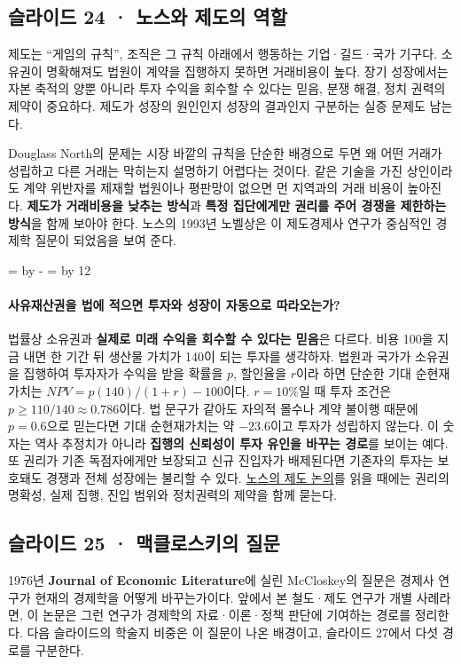 \documentclass[10pt,a4paper]{article}
\newcommand{\ReserveQuestionSpace}{%
  \par\begingroup
  \dimen0=\pagegoal \advance\dimen0 by -\pagetotal
  \dimen2=\baselineskip \multiply\dimen2 by 12
  \ifdim\dimen0<\dimen2 \newpage\fi
  \endgroup}
\begin{document}
\subsection{슬라이드 24 · 노스와 제도의 역할}
제도는 “게임의 규칙”, 조직은 그 규칙 아래에서 행동하는 기업·길드·국가 기구다. 소유권이 명확해져도 법원이 계약을 집행하지 못하면 거래비용이 높다. 장기 성장에서는 자본 축적의 양뿐 아니라 투자 수익을 회수할 수 있다는 믿음, 분쟁 해결, 정치 권력의 제약이 중요하다. 제도가 성장의 원인인지 성장의 결과인지 구분하는 실증 문제도 남는다.\par

Douglass North의 문제는 시장 바깥의 규칙을 단순한 배경으로 두면 왜 어떤 거래가 성립하고 다른 거래는 막히는지 설명하기 어렵다는 것이다. 같은 기술을 가진 상인이라도 계약 위반자를 제재할 법원이나 평판망이 없으면 먼 지역과의 거래 비용이 높아진다. \textbf{제도가 거래비용을 낮추는 방식}과 \textbf{특정 집단에게만 권리를 주어 경쟁을 제한하는 방식}을 함께 보아야 한다. 노스의 1993년 노벨상은 이 제도경제사 연구가 중심적인 경제학 질문이 되었음을 보여 준다.\par

\ReserveQuestionSpace
\paragraph{사유재산권을 법에 적으면 투자와 성장이 자동으로 따라오는가?}
법률상 소유권과 \textbf{실제로 미래 수익을 회수할 수 있다는 믿음}은 다르다. 비용 100을 지금 내면 한 기간 뒤 생산물 가치가 140이 되는 투자를 생각하자. 법원과 국가가 소유권을 집행하여 투자자가 수익을 받을 확률을 $p$, 할인율을 $r$이라 하면 단순한 기대 순현재가치는 $NPV=p(140)/(1+r)-100$이다. $r=10\%$일 때 투자 조건은 $p\geq110/140\approx0.786$이다. 법 문구가 같아도 자의적 몰수나 계약 불이행 때문에 $p=0.6$으로 믿는다면 기대 순현재가치는 약 $-23.6$이고 투자가 성립하지 않는다. 이 숫자는 역사 추정치가 아니라 \textbf{집행의 신뢰성이 투자 유인을 바꾸는 경로}를 보이는 예다. 또 권리가 기존 독점자에게만 보장되고 신규 진입자가 배제된다면 기존자의 투자는 보호돼도 경쟁과 전체 성장에는 불리할 수 있다. \href{https://www.aeaweb.org/articles?id=10.1257\%2Fjep.5.1.97}{노스의 제도 논의}를 읽을 때에는 권리의 명확성, 실제 집행, 진입 범위와 정치권력의 제약을 함께 묻는다.\par

\subsection{슬라이드 25 · 맥클로스키의 질문}
1976년 \textbf{Journal of Economic Literature}에 실린 McCloskey의 질문은 경제사 연구가 현재의 경제학을 어떻게 바꾸는가이다. 앞에서 본 철도·제도 연구가 개별 사례라면, 이 논문은 그런 연구가 경제학의 자료·이론·정책 판단에 기여하는 경로를 정리한다. 다음 슬라이드의 학술지 비중은 이 질문이 나온 배경이고, 슬라이드 27에서 다섯 경로를 구분한다.\par
\end{document}
